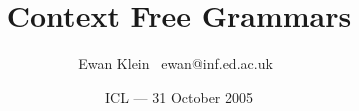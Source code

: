 % 
%
%
%
%
%
%
%
%
%
%
%
%
%
%
%
%
%
%
%
%
%
%
%
%
%

\title{Context Free Grammars}
\author{Ewan Klein \newline \mbox{ }ewan@inf.ed.ac.uk\mbox{ }}
\date{ICL --- 31 October 2005}



\usepackage{array}
\usepackage{url}
\usepackage{alltt}


\usepackage{color}
\usepackage{amsmath}
\usepackage{graphicx}

\usepackage{synttree}
\branchheight{5ex}



\newcommand{\Hilite}[1]{\colorbox{yellow}{#1}}
\newcommand{\Shade}[1]{\colorbox{light}{#1}}

